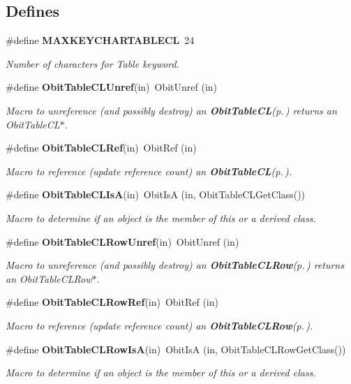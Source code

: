 \subsection*{Defines}
\begin{CompactItemize}
\item 
\#define {\bf MAXKEYCHARTABLECL}\ 24
\begin{CompactList}\small\item\em Number of characters for Table keyword. \item\end{CompactList}\item 
\#define {\bf Obit\-Table\-CLUnref}(in)\ Obit\-Unref (in)
\begin{CompactList}\small\item\em Macro to unreference (and possibly destroy) an {\bf Obit\-Table\-CL}{\rm (p.\,\pageref{structObitTableCL})} returns an Obit\-Table\-CL$\ast$. \item\end{CompactList}\item 
\#define {\bf Obit\-Table\-CLRef}(in)\ Obit\-Ref (in)
\begin{CompactList}\small\item\em Macro to reference (update reference count) an {\bf Obit\-Table\-CL}{\rm (p.\,\pageref{structObitTableCL})}. \item\end{CompactList}\item 
\#define {\bf Obit\-Table\-CLIs\-A}(in)\ Obit\-Is\-A (in, Obit\-Table\-CLGet\-Class())
\begin{CompactList}\small\item\em Macro to determine if an object is the member of this or a derived class. \item\end{CompactList}\item 
\#define {\bf Obit\-Table\-CLRow\-Unref}(in)\ Obit\-Unref (in)
\begin{CompactList}\small\item\em Macro to unreference (and possibly destroy) an {\bf Obit\-Table\-CLRow}{\rm (p.\,\pageref{structObitTableCLRow})} returns an Obit\-Table\-CLRow$\ast$. \item\end{CompactList}\item 
\#define {\bf Obit\-Table\-CLRow\-Ref}(in)\ Obit\-Ref (in)
\begin{CompactList}\small\item\em Macro to reference (update reference count) an {\bf Obit\-Table\-CLRow}{\rm (p.\,\pageref{structObitTableCLRow})}. \item\end{CompactList}\item 
\#define {\bf Obit\-Table\-CLRow\-Is\-A}(in)\ Obit\-Is\-A (in, Obit\-Table\-CLRow\-Get\-Class())
\begin{CompactList}\small\item\em Macro to determine if an object is the member of this or a derived class. \item\end{CompactList}\end{CompactItemize}
